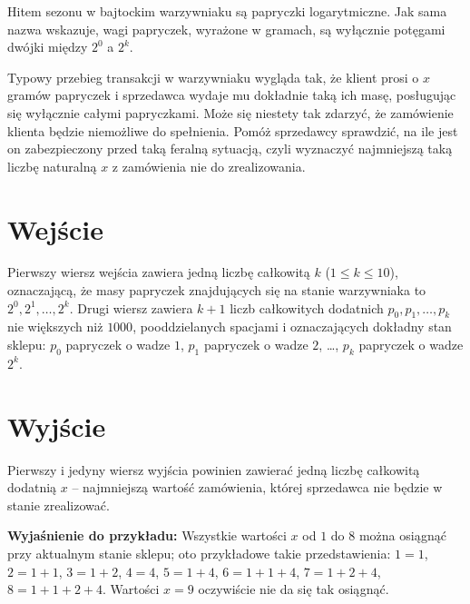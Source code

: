 \documentclass{spiral-kurs}
\begin{document}
\makeheader
%
  Hitem sezonu w bajtockim warzywniaku są papryczki logarytmiczne.
  Jak sama nazwa wskazuje, wagi papryczek, wyrażone w gramach, są wyłącznie
  potęgami dwójki między $2^0$ a $2^k$.

  Typowy przebieg transakcji w warzywniaku wygląda tak, że klient prosi
  o $x$ gramów papryczek i sprzedawca wydaje mu dokładnie taką ich masę,
  posługując się wyłącznie całymi papryczkami.
  Może się niestety tak zdarzyć, że zamówienie klienta będzie niemożliwe
  do spełnienia.
  Pomóż sprzedawcy sprawdzić, na ile jest on zabezpieczony przed taką feralną
  sytuacją, czyli wyznaczyć najmniejszą taką liczbę naturalną $x$ z zamówienia
  nie do zrealizowania.

\section{Wejście}
  Pierwszy wiersz wejścia zawiera jedną liczbę całkowitą $k$
  ($1\le k\le 10$), oznaczającą, że masy papryczek znajdujących się na stanie
  warzywniaka to $2^0,2^1,\dots,2^k$.
  Drugi wiersz zawiera $k+1$ liczb całkowitych dodatnich $p_0,p_1,\dots,p_k$
  nie większych niż $1000$, pooddzielanych spacjami
  i oznaczających dokładny stan sklepu: $p_0$ papryczek o wadze $1$, $p_1$ papryczek
  o wadze $2$, \ldots, $p_k$ papryczek o wadze $2^k$.

\section{Wyjście}
   Pierwszy i jedyny wiersz wyjścia powinien zawierać jedną liczbę całkowitą
   dodatnią $x$ -- najmniejszą wartość zamówienia, której sprzedawca nie
   będzie w stanie zrealizować.


   \medskip
   \noindent
   \textbf{Wyjaśnienie do przykładu:} Wszystkie wartości $x$ od $1$ do $8$
   można osiągnąć przy aktualnym stanie sklepu; oto przykładowe takie
   przedstawienia:
   $1=1$, $2=1+1$, $3=1+2$, $4=4$, $5=1+4$, $6=1+1+4$, $7=1+2+4$, $8=1+1+2+4$.
   Wartości $x=9$ oczywiście nie da się tak osiągnąć.

 
\end{document}
